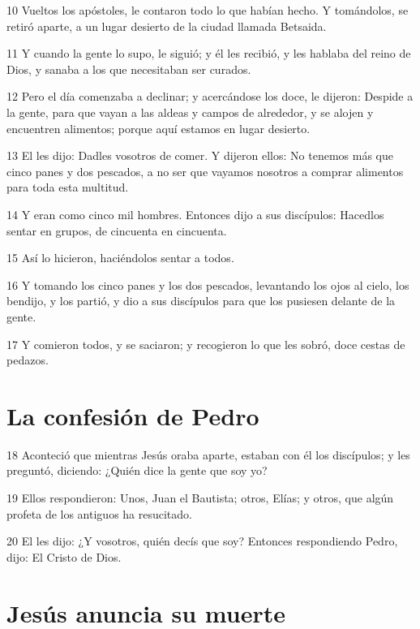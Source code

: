 \par 10 Vueltos los apóstoles, le contaron todo lo que habían hecho. Y tomándolos, se retiró aparte, a un lugar desierto de la ciudad llamada Betsaida.
\par 11 Y cuando la gente lo supo, le siguió; y él les recibió, y les hablaba del reino de Dios, y sanaba a los que necesitaban ser curados.
\par 12 Pero el día comenzaba a declinar; y acercándose los doce, le dijeron: Despide a la gente, para que vayan a las aldeas y campos de alrededor, y se alojen y encuentren alimentos; porque aquí estamos en lugar desierto.
\par 13 El les dijo: Dadles vosotros de comer. Y dijeron ellos: No tenemos más que cinco panes y dos pescados, a no ser que vayamos nosotros a comprar alimentos para toda esta multitud.
\par 14 Y eran como cinco mil hombres. Entonces dijo a sus discípulos: Hacedlos sentar en grupos, de cincuenta en cincuenta.
\par 15 Así lo hicieron, haciéndolos sentar a todos.
\par 16 Y tomando los cinco panes y los dos pescados, levantando los ojos al cielo, los bendijo, y los partió, y dio a sus discípulos para que los pusiesen delante de la gente.
\par 17 Y comieron todos, y se saciaron; y recogieron lo que les sobró, doce cestas de pedazos.

\section*{La confesión de Pedro}

\par 18 Aconteció que mientras Jesús oraba aparte, estaban con él los discípulos; y les preguntó, diciendo: ¿Quién dice la gente que soy yo?
\par 19 Ellos respondieron: Unos, Juan el Bautista; otros, Elías; y otros, que algún profeta de los antiguos ha resucitado.
\par 20 El les dijo: ¿Y vosotros, quién decís que soy? Entonces respondiendo Pedro, dijo: El Cristo de Dios.

\section*{Jesús anuncia su muerte}

